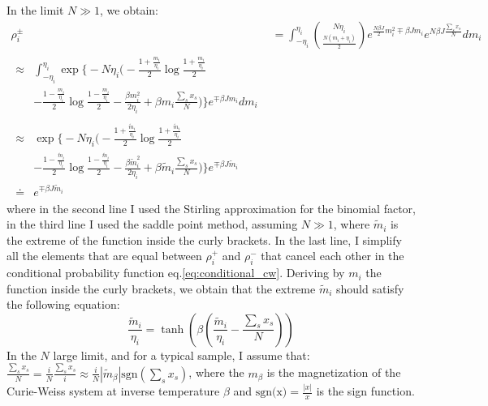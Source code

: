 \documentclass[10pt, notitlepage]{revtex4-2}
\begin{document}
In the limit $N \gg 1$, we obtain:
 \begin{align}
 \rho_i^{\pm} & = 
  \int_{-\eta_i}^{\eta_i} \binom{N\eta_i}{\frac{N(m_i+\eta_i)}{2}} e^{\frac{N \beta J}{2}m_i^{2} \mp \beta J m_i } e^{N \beta J \frac{\sum_s x_s}{N}} dm_i \\
\begin{split} 
  \approx & \int_{-\eta_i}^{\eta_i} \exp\bigg\{-N\eta_i \big( -\frac{1+\frac{m_i}{\eta_i}}{2} \log\frac{1+\frac{m_i}{\eta_i}}{2} \\
   & - \frac{1-\frac{m_i}{\eta_i}}{2} \log\frac{1-\frac{m_i}{\eta_i}}{2} 
      - \frac{\beta m_i^2}{2 \eta_i} + \beta m_i \frac{\sum_s x_s}{N}\big) \bigg\} e^{\mp \beta J m_i} dm_i
\end{split} \\
\begin{split} 
  \approx & \exp\bigg\{-N\eta_i \big( -\frac{1+\frac{\tilde{m}_{i}}{\eta_i}}{2} \log\frac{1+\frac{\tilde{m}_{i}}{\eta_i}}{2} \\
   & - \frac{1-\frac{\tilde{m}_{i}}{\eta_i}}{2} \log\frac{1-\frac{\tilde{m}_{i}}{\eta_i}}{2} 
      - \frac{\beta \tilde{m}_{i}^2}{2 \eta_i} + \beta \tilde{m}_{i} \frac{\sum_s x_s}{N}\big) \bigg\} e^{\mp \beta J \tilde{m}_{i}} \\
    \doteq & e^{\mp \beta J \tilde{m}_{i}} 
\end{split}
\end{align}
where in the second line I used the Stirling approximation for the binomial factor, in the third line I used the saddle point method, assuming $N\gg 1$, where $\tilde{m}_{i}$ is the extreme of the function inside the curly brackets. In the last line, I simplify all the elements that are equal between $\rho_i^{+} $ and $\rho_i^{-}$ that cancel each other in the conditional probability function eq.\ref{eq:conditional_cw}. Deriving by $m_i$ the function inside the curly brackets, we obtain that the extreme $\tilde{m}_{i}$ should satisfy the following equation:
\begin{equation}
\frac{\tilde{m}_{i}}{\eta_i} = \tanh \left( \beta(\frac{\tilde{m}_{i}}{\eta_i} - \frac{\sum_s x_s}{N}) \right)
\label{eq:extrem_i}
\end{equation}
In the $N$ large limit, and for a typical sample, I assume that: $ \frac{\sum_s x_s}{N} = \frac{i}{N} \frac{\sum_s x_s}{i}  \approx \frac{i}{N} |\tilde{m}_{\beta}| \text{sgn}(\sum_s x_s)$, where the $m_{\beta}$ is the magnetization of the Curie-Weiss system at inverse temperature $\beta$ and $\text{sgn(x)} = \frac{|x|}{x}$ is the sign function.
\end{document}
